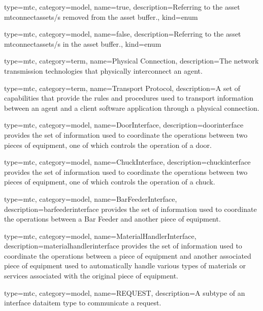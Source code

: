 {
  type=mtc,
  category=model,
  name={true},
  description={Referring to the \gls{asset mtconnectassets}/s removed from the \gls{asset buffer}.},
  kind={enum}
}

{
  type=mtc,
  category=model,
  name={false},
  description={Referring to the \gls{asset mtconnectassets}/s in the \gls{asset buffer}.},
  kind={enum}
}

{
  type=mtc,
  category=term,
  name={Physical Connection},
  description={The network transmission technologies that physically interconnect an \gls{agent}.}
}

{
  type=mtc,
  category=term,
  name={Transport Protocol},
  description={A set of capabilities that provide the rules and procedures used to transport information between an \gls{agent} and a client software application through a \gls{physical connection}.}
}

{
  type=mtc,
  category=model,
  name={DoorInterface},
  description={\gls{doorinterface} provides the set of information used to coordinate the operations between two pieces of equipment, one of which controls the operation of a door. }
}


{
  type=mtc,
  category=model,
  name={ChuckInterface},
  description={\gls{chuckinterface} provides the set of information used to coordinate the operations between two pieces of equipment, one of which controls the operation of a chuck.  }
}


{
  type=mtc,
  category=model,
  name={BarFeederInterface},
  description={\gls{barfeederinterface} provides the set of information used to coordinate the operations between a Bar Feeder and another piece of equipment.  }
}


{
  type=mtc,
  category=model,
  name={MaterialHandlerInterface},
  description={\gls{materialhandlerinterface} provides the set of information used to coordinate the operations between a piece of equipment and another associated piece of equipment used to automatically handle various types of materials or services associated with the original piece of equipment. }
}


{
  type=mtc,
  category=model,
  name={REQUEST},
  description={A subtype of an \gls{interface} \gls{dataitem} type to communicate a request. }
}


